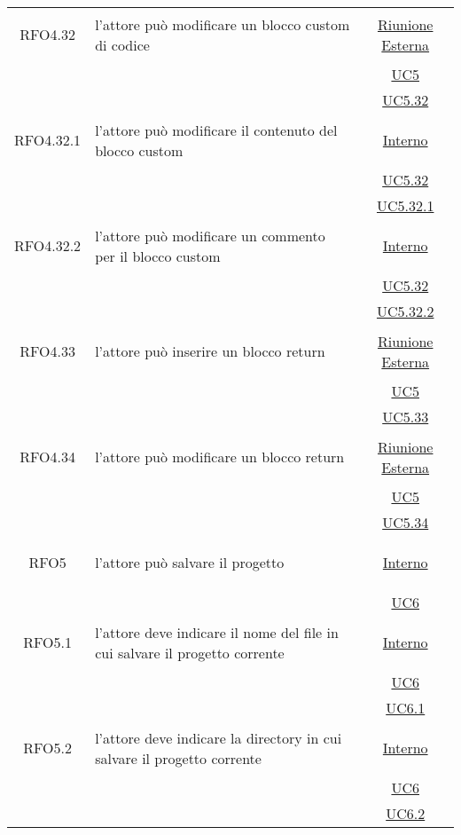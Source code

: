 \begin{longtable}{|c|>{\centering}m{7cm}|c|}
\hypertarget{RFO4.32}{RFO4.32} & l'attore può modificare un blocco custom di codice & \hyperlink{Riunione Esterna}{Riunione Esterna}\\
& &\hyperref[UC5]{UC5}\\
& &\hyperref[UC5.32]{UC5.32}\\ \hline

\hypertarget{RFO4.32.1}{RFO4.32.1} & l'attore può modificare il contenuto del blocco custom & \hyperlink{Interno}{Interno}\\
& &\hyperref[UC5.32]{UC5.32}\\
& &\hyperref[UC5.32.1]{UC5.32.1}\\ \hline

\hypertarget{RFO4.32.2}{RFO4.32.2} & l'attore può modificare un commento per il blocco custom & \hyperlink{Interno}{Interno}\\
& &\hyperref[UC5.32]{UC5.32}\\
& &\hyperref[UC5.32.2]{UC5.32.2}\\ \hline
\hypertarget{RFO4.33}{RFO4.33} & l'attore può inserire un blocco return & \hyperlink{Riunione Esterna}{Riunione Esterna}\\
& &\hyperref[UC5]{UC5}\\
& &\hyperref[UC5.33]{UC5.33}\\ \hline

\hypertarget{RFO4.34}{RFO4.34} & l'attore può modificare un blocco return & \hyperlink{Riunione Esterna}{Riunione Esterna}\\
& &\hyperref[UC5]{UC5}\\
& &\hyperref[UC5.34]{UC5.34}\\ \hline

\hypertarget{RFO5}{RFO5} & l'attore può salvare il progetto &  \hyperlink{Interno}{Interno}\\
& & \hyperref[UC6]{UC6}\\ \hline

\hypertarget{RFO5.1}{RFO5.1} & l'attore deve indicare il nome del file in cui salvare il progetto corrente&  \hyperlink{Interno}{Interno}\\
& & \hyperref[UC6]{UC6}\\
& & \hyperref[UC6.1]{UC6.1}\\ \hline

\hypertarget{RFO5.2}{RFO5.2} & l'attore deve indicare la directory in cui salvare il progetto corrente&  \hyperlink{Interno}{Interno}\\
& & \hyperref[UC6]{UC6}\\
& & \hyperref[UC6.2]{UC6.2}\\ \hline


\end{longtable}
